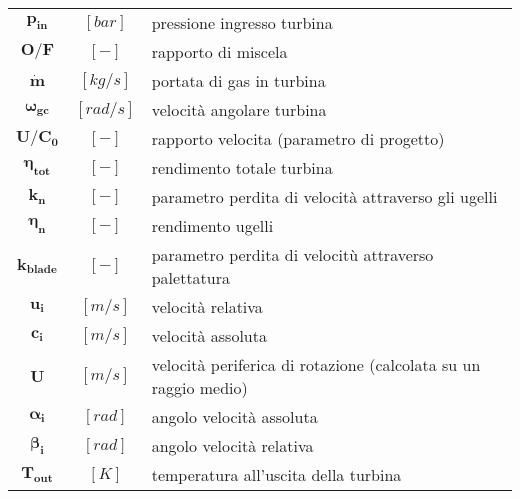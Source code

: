 \begin{multicols}{2}
\begin{tabularx}{\linewidth}{cc>{\raggedright\arraybackslash}X}
		$\bm{p_{in}}$ & $[bar]$ & pressione ingresso turbina \\
		$\bm{O/F}$ & $[-]$ & rapporto di miscela\\
		$\bm{\dot{m}}$ & $[kg/s]$ & portata di gas in turbina\\
		$\bm{\omega_{gc}}$ & $[rad/s]$ & velocità angolare turbina \\
		$\bm{U/C_0}$ & $[-]$ & rapporto velocita (parametro di progetto) \\
		$\bm{\eta_{tot}}$ & $[-]$ & rendimento totale turbina \\
		$\bm{k_n}$ & $[-]$ & parametro perdita di velocità attraverso gli ugelli  \\
		$\bm{\eta_n}$ & $[-]$ & rendimento ugelli \\
		$\bm{k_{blade}}$ & $[-]$ & parametro perdita di velocitù attraverso palettatura \\
		$\bm{u_i}$ & $[m/s]$ & velocità relativa \\
		$\bm{c_i}$ & $[m/s]$ & velocità assoluta \\
		$\bm{U}$ & $[m/s]$ & velocità periferica di rotazione (calcolata su un raggio medio) \\
		$\bm{\alpha_i}$ & $[rad]$ & angolo velocità assoluta \\
		$\bm{\beta_i}$ & $[rad]$ & angolo velocità relativa \\
		$\bm{T_{out}}$ & $[K]$ & temperatura all'uscita della turbina
	\end{tabularx}


\end{multicols}
